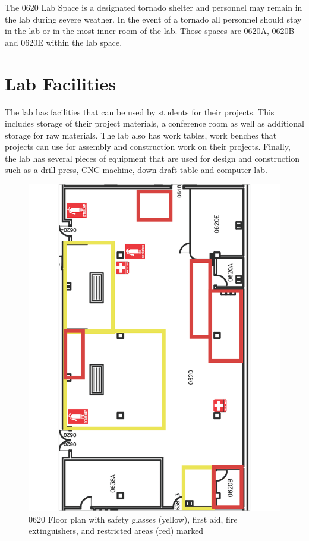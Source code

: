 The 0620 Lab Space is a designated tornado shelter and personnel may remain in the lab during severe weather.  In the event of a tornado all personnel should stay in the lab or in the most inner room of the lab.  Those spaces are 0620A, 0620B and 0620E within the lab space.

\chapter{Lab Facilities}
The lab has facilities that can be used by students for their projects.  This includes storage of their project materials, a conference room as well as additional storage for raw materials.  The lab also has work tables, work benches that projects can use for assembly and construction work on their projects.  Finally, the lab has several pieces of equipment that are used for design and construction such as a drill press, CNC machine, down draft table and computer lab.

\begin{figure}[ht]
\centering
\includegraphics[width=5.8in]{images/0620_Floor_Plan.png}
\caption{0620 Floor plan with safety glasses (yellow), first aid, fire extinguishers, and restricted areas (red) marked}
\label{fig:0620_floor_plan}
\end{figure}

